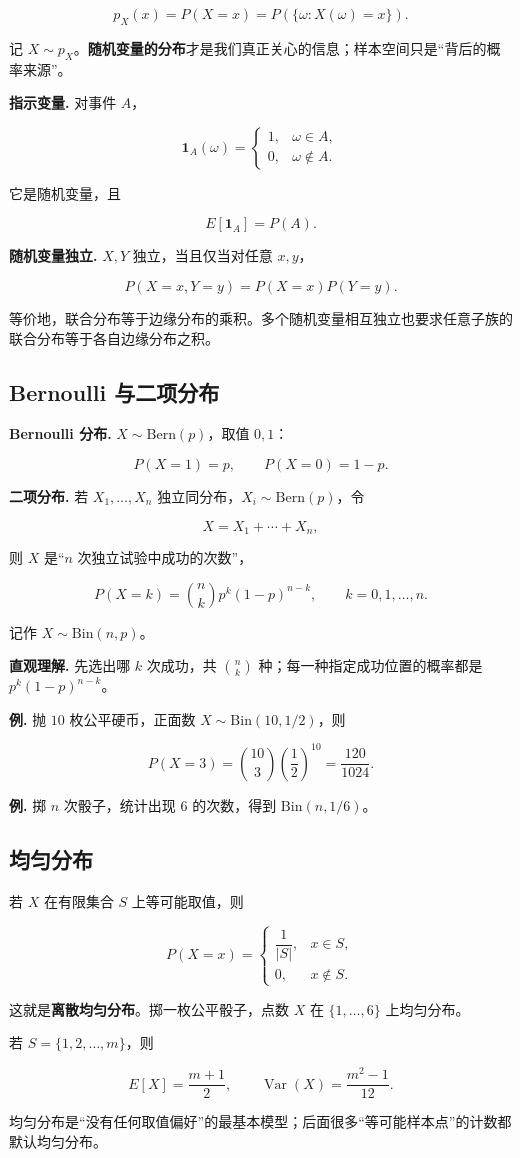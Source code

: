 \[
p_X(x)=P(X=x)=P(\{\omega:X(\omega)=x\}).
\]

记 $X\sim p_X$。\textbf{随机变量的分布}才是我们真正关心的信息；样本空间只是“背后的概率来源”。

\textbf{指示变量.} 对事件 $A$，

\[
\mathbf 1_A(\omega)=
\begin{cases}
1, & \omega\in A,\\
0, & \omega\notin A.
\end{cases}
\]

它是随机变量，且

\[
E[\mathbf 1_A]=P(A).
\]

\textbf{随机变量独立.} $X,Y$ 独立，当且仅当对任意 $x,y$，

\[
P(X=x,Y=y)=P(X=x)P(Y=y).
\]

等价地，联合分布等于边缘分布的乘积。多个随机变量相互独立也要求任意子族的联合分布等于各自边缘分布之积。

\subsection{Bernoulli 与二项分布}


\textbf{Bernoulli 分布.} $X\sim\mathrm{Bern}(p)$，取值 $0,1$：

\[
P(X=1)=p,\qquad P(X=0)=1-p.
\]

\textbf{二项分布.} 若 $X_1,\dots,X_n$ 独立同分布，$X_i\sim\mathrm{Bern}(p)$，令

\[
X=X_1+\cdots+X_n,
\]

则 $X$ 是“$n$ 次独立试验中成功的次数”，

\[
P(X=k)=\binom nk p^k(1-p)^{n-k},\qquad k=0,1,\dots,n.
\]

记作 $X\sim\mathrm{Bin}(n,p)$。

\textbf{直观理解.} 先选出哪 $k$ 次成功，共 $\binom nk$ 种；每一种指定成功位置的概率都是 $p^k(1-p)^{n-k}$。

\textbf{例.} 抛 $10$ 枚公平硬币，正面数 $X\sim\mathrm{Bin}(10,1/2)$，则

\[
P(X=3)=\binom{10}{3}\left(\frac12\right)^{10}=\frac{120}{1024}.
\]

\textbf{例.} 掷 $n$ 次骰子，统计出现 $6$ 的次数，得到 $\mathrm{Bin}(n,1/6)$。

\subsection{均匀分布}


若 $X$ 在有限集合 $S$ 上等可能取值，则

\[
P(X=x)=
\begin{cases}
\dfrac{1}{|S|}, & x\in S,\\[4pt]
0, & x\notin S.
\end{cases}
\]

这就是\textbf{离散均匀分布}。掷一枚公平骰子，点数 $X$ 在 $\{1,\dots,6\}$ 上均匀分布。

若 $S=\{1,2,\dots,m\}$，则

\[
E[X]=\frac{m+1}{2},\qquad
\operatorname{Var}(X)=\frac{m^2-1}{12}.
\]

均匀分布是“没有任何取值偏好”的最基本模型；后面很多“等可能样本点”的计数都默认均匀分布。
